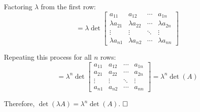 Factoring $\lambda$ from the first row:
$$= \lambda \det\begin{bmatrix} a_{11} & a_{12} & \cdots & a_{1n} \\ \lambda a_{21} & \lambda a_{22} & \cdots & \lambda a_{2n} \\ \vdots & \vdots & \ddots & \vdots \\ \lambda a_{n1} & \lambda a_{n2} & \cdots & \lambda a_{nn} \end{bmatrix}$$

Repeating this process for all $n$ rows:
$$= \lambda^n \det\begin{bmatrix} a_{11} & a_{12} & \cdots & a_{1n} \\ a_{21} & a_{22} & \cdots & a_{2n} \\ \vdots & \vdots & \ddots & \vdots \\ a_{n1} & a_{n2} & \cdots & a_{nn} \end{bmatrix} = \lambda^n \det(A)$$

Therefore, $\det(\lambda A) = \lambda^n \det(A)$. $\hfill \square$